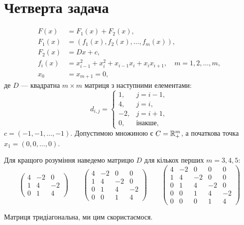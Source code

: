 \section{Четверта задача}

\begin{equation}
    \begin{aligned}
        F(x) &= F_1(x) + F_2(x), \\
        F_1(x) &= (f_1(x), f_2(x), \dots, f_m(x)), \\
        F_2(x) &= D x + c, \\
        f_i(x) &= x_{i - 1}^2 + x_i^2 + x_{i - 1} x_i + x_i x_{i + 1}, \quad m = 1, 2, \dots, m, \\
        x_0 &= x_{m + 1} = 0,
    \end{aligned}
\end{equation}
де $D$ --- квадратна $m \times m$ матриця з наступними елементами:
\begin{equation}
    d_{i,j} = \begin{cases}
         1, & j = i - 1, \\
         4, & j = i, \\
        -2, & j = i + 1, \\
         0, & \text{інакше},
    \end{cases}
\end{equation}
$c = (-1, -1, \dots, -1)$. Допустимою множиною є $C = \mathbb{R}_+^m$, а початкова точка $x_1 = (0, 0, \dots, 0)$. \medskip

Для кращого розуміння наведемо матрицю $D$ для кількох перших $m = 3, 4, 5$:
\begin{equation}
    \begin{pmatrix}
        4 & -2 &  0 \\
        1 &  4 & -2 \\
        0 &  1 &  4
    \end{pmatrix}
    \qquad
    \begin{pmatrix}
        4 & -2 &  0 &  0 \\
        1 &  4 & -2 &  0 \\
        0 &  1 &  4 & -2 \\
        0 &  0 &  1 &  4
    \end{pmatrix}
    \qquad
    \begin{pmatrix}
        4 & -2 &  0 &  0 &  0 \\
        1 &  4 & -2 &  0 &  0 \\
        0 &  1 &  4 & -2 &  0 \\
        0 &  0 &  1 &  4 & -2 \\
        0 &  0 &  0 &  1 &  4
    \end{pmatrix}
\end{equation}

\begin{remark}
    Матриця тридіагональна, ми цим скористаємося.
\end{remark}
